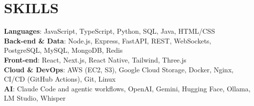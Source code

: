 \documentclass[letterpaper,11pt]{article}
\begin{document}
\section{SKILLS}
\begin{itemize}[leftmargin=0in, label={}]
    \small{\item{
    \textbf{Languages}{: JavaScript, TypeScript, Python, SQL, Java, HTML/CSS}\vspace{2pt} \\
    \textbf{Back-end \& Data}{: Node.js, Express, FastAPI, REST, WebSockets, PostgreSQL, MySQL, MongoDB, Redis}\vspace{2pt} \\
    \textbf{Front-end}{: React, Next.js, React Native, Tailwind, Three.js}\vspace{2pt} \\
    \textbf{Cloud \& DevOps}{: AWS (EC2, S3), Google Cloud Storage, Docker, Nginx, CI/CD (GitHub Actions), Git, Linux}\vspace{2pt} \\
    \textbf{AI}{: Claude Code and agentic workflows, OpenAI, Gemini, Hugging Face, Ollama, LM Studio, Whisper}
    }}
\end{itemize}
\end{document}
